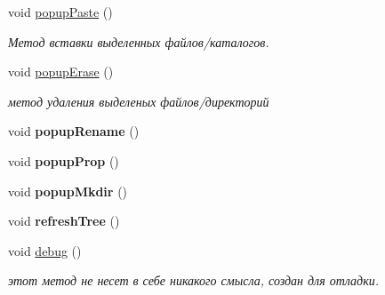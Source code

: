 \begin{DoxyCompactItemize}
\mbox{\label{class_custom_tree_ac209cddc61a0a469a8f7c658b4a043a4}} 
void \hyperlink{class_custom_tree_ac209cddc61a0a469a8f7c658b4a043a4}{popup\+Paste} ()
\begin{DoxyCompactList}\small\item\em Метод вставки выделенных файлов/каталогов. \end{DoxyCompactList}\item 
\mbox{\label{class_custom_tree_accdc09b7ceea8a35c7942fb9924dce1a}} 
void \hyperlink{class_custom_tree_accdc09b7ceea8a35c7942fb9924dce1a}{popup\+Erase} ()
\begin{DoxyCompactList}\small\item\em метод удаления выделеных файлов/директорий \end{DoxyCompactList}\item 
\mbox{\label{class_custom_tree_a8bbf60d9a3a0013f06e0c1f664c1232d}} 
void {\bfseries popup\+Rename} ()
\item 
\mbox{\label{class_custom_tree_ade7eaee5334057660fc809135a552ff5}} 
void {\bfseries popup\+Prop} ()
\item 
\mbox{\label{class_custom_tree_a3cf5d572ab9c17bb1d1de3bf5b3bff32}} 
void {\bfseries popup\+Mkdir} ()
\item 
\mbox{\label{class_custom_tree_ae5b4a2f7ebd76218da697b05f367231c}} 
void {\bfseries refresh\+Tree} ()
\item 
\mbox{\label{class_custom_tree_adc8adaa0a30d1fc981a724cb0b8265df}} 
void \hyperlink{class_custom_tree_adc8adaa0a30d1fc981a724cb0b8265df}{debug} ()
\begin{DoxyCompactList}\small\item\em этот метод не несет в себе никакого смысла, создан для отладки. \end{DoxyCompactList}\end{DoxyCompactItemize}
